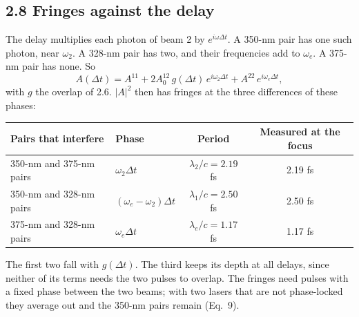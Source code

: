 \documentclass[10pt]{article}
\begin{document}
\subsection*{2.8 Fringes against the delay}
The delay multiplies each photon of beam 2 by $e^{i\omega\Delta t}$. A 350-nm pair has one such photon, near
$\omega_2$. A 328-nm pair has two, and their frequencies add to $\omega_e$. A 375-nm pair has none. So
\begin{equation}A(\Delta t) = A^{11} + 2A^{12}_0\,g(\Delta t)\,e^{i\omega_2\Delta t} + A^{22}\,e^{i\omega_e\Delta t},\end{equation}
with $g$ the overlap of 2.6. $|A|^2$ then has fringes at the three differences of these phases:
\begin{center}\small\begin{tabular}{llcc}\toprule
Pairs that interfere & Phase & Period & Measured at the focus\\\midrule
350-nm and 375-nm pairs & $\omega_2\Delta t$ & $\lambda_2/c = 2.19$ fs & 2.19 fs\\
350-nm and 328-nm pairs & $(\omega_e-\omega_2)\Delta t$ & $\lambda_1/c = 2.50$ fs & 2.50 fs\\
375-nm and 328-nm pairs & $\omega_e\Delta t$ & $\lambda_e/c = 1.17$ fs & 1.17 fs\\\bottomrule\end{tabular}\end{center}
The first two fall with $g(\Delta t)$. The third keeps its depth at all delays, since neither of its terms needs the
two pulses to overlap. The fringes need pulses with a fixed phase between the two beams; with two lasers that are
not phase-locked they average out and the 350-nm pairs remain (Eq.~9).
\end{document}
